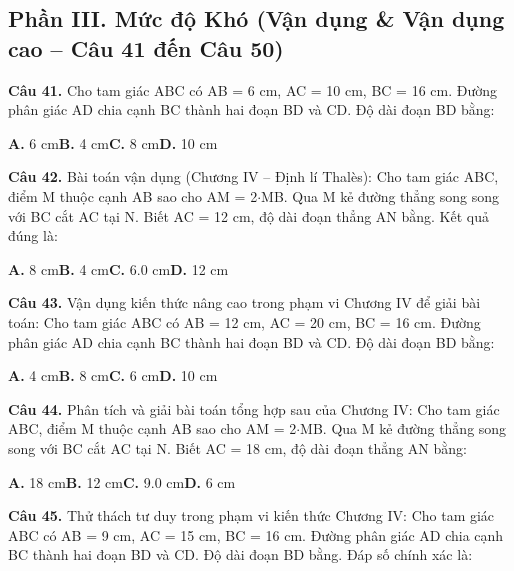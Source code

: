\documentclass[11pt,a4paper]{article}
\begin{document}
\subsection*{\color{accent} Phần III. Mức độ Khó (Vận dụng \& Vận dụng cao -- Câu 41 đến Câu 50)}
\textbf{\color{primary} Câu 41.} Cho tam giác ABC có AB = 6 cm, AC = 10 cm, BC = 16 cm. Đường phân giác AD chia cạnh BC thành hai đoạn BD và CD. Độ dài đoạn BD bằng:\par
\hspace*{1.5em}\textbf{A.} 6 cm\quad\quad \textbf{B.} 4 cm\quad\quad \textbf{C.} 8 cm\quad\quad \textbf{D.} 10 cm\par\vspace{2pt}
\textbf{\color{primary} Câu 42.} Bài toán vận dụng (Chương IV – Định lí Thalès): Cho tam giác ABC, điểm M thuộc cạnh AB sao cho AM = 2$\cdot$MB. Qua M kẻ đường thẳng song song với BC cắt AC tại N. Biết AC = 12 cm, độ dài đoạn thẳng AN bằng. Kết quả đúng là:\par
\hspace*{1.5em}\textbf{A.} 8 cm\quad\quad \textbf{B.} 4 cm\quad\quad \textbf{C.} 6.0 cm\quad\quad \textbf{D.} 12 cm\par\vspace{2pt}
\textbf{\color{primary} Câu 43.} Vận dụng kiến thức nâng cao trong phạm vi Chương IV để giải bài toán: Cho tam giác ABC có AB = 12 cm, AC = 20 cm, BC = 16 cm. Đường phân giác AD chia cạnh BC thành hai đoạn BD và CD. Độ dài đoạn BD bằng:\par
\hspace*{1.5em}\textbf{A.} 4 cm\quad\quad \textbf{B.} 8 cm\quad\quad \textbf{C.} 6 cm\quad\quad \textbf{D.} 10 cm\par\vspace{2pt}
\textbf{\color{primary} Câu 44.} Phân tích và giải bài toán tổng hợp sau của Chương IV: Cho tam giác ABC, điểm M thuộc cạnh AB sao cho AM = 2$\cdot$MB. Qua M kẻ đường thẳng song song với BC cắt AC tại N. Biết AC = 18 cm, độ dài đoạn thẳng AN bằng:\par
\hspace*{1.5em}\textbf{A.} 18 cm\quad\quad \textbf{B.} 12 cm\quad\quad \textbf{C.} 9.0 cm\quad\quad \textbf{D.} 6 cm\par\vspace{2pt}
\textbf{\color{primary} Câu 45.} Thử thách tư duy trong phạm vi kiến thức Chương IV: Cho tam giác ABC có AB = 9 cm, AC = 15 cm, BC = 16 cm. Đường phân giác AD chia cạnh BC thành hai đoạn BD và CD. Độ dài đoạn BD bằng. Đáp số chính xác là:\par
\end{document}
